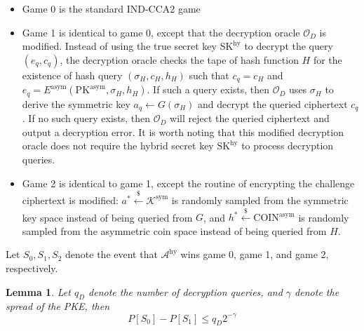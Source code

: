 \documentclass{article}
\newcommand{\leftsample}{\overset{{\scriptscriptstyle\$}}{\leftarrow}}
\newtheorem{lemma}{Lemma}
\begin{document}
\begin{itemize}
    \item Game 0 is the standard IND-CCA2 game

    \item Game 1 is identical to game 0, except that the decryption oracle $\mathcal{O}_D$ is modified. Instead of using the true secret key $\text{SK}^\text{hy}$ to decrypt the query $(e_q, c_q)$, the decryption oracle checks the tape of hash function $H$ for the existence of hash query $(\sigma_H, c_H, h_H)$ such that $c_q = c_H$ and $e_q = E^\text{asym}(\text{PK}^\text{asym}, \sigma_H, h_H)$. If such a query exists, then $\mathcal{O}_D$ uses $\sigma_H$ to derive the symmetric key $a_q \leftarrow G(\sigma_H)$ and decrypt the queried ciphertext $c_q$. If no such query exists, then $\mathcal{O}_D$ will reject the queried ciphertext and output a decryption error. It is worth noting that this modified decryption oracle does not require the hybrid secret key $\text{SK}^\text{hy}$ to process decryption queries.

    \item Game 2 is identical to game 1, except the routine of encrypting the challenge ciphertext is modified: $a^\ast \leftsample \mathcal{K}^\text{sym}$ is randomly sampled from the symmetric key space instead of being queried from $G$, and $h^\ast \leftsample \text{COIN}^\text{asym}$ is randomly sampled from the asymmetric coin space instead of being queried from $H$.
\end{itemize}

Let $S_0, S_1, S_2$ denote the event that $\mathcal{A}^\text{hy}$ wins game 0, game 1, and game 2, respectively.

\begin{lemma}\label{fo-win0-win1}
    Let $q_D$ denote the number of decryption queries, and $\gamma$ denote the spread of the PKE, then
    \begin{equation*}
        P[S_0] - P[S_1] \leq q_D 2^{-\gamma}
    \end{equation*}
\end{lemma}
\end{document}

